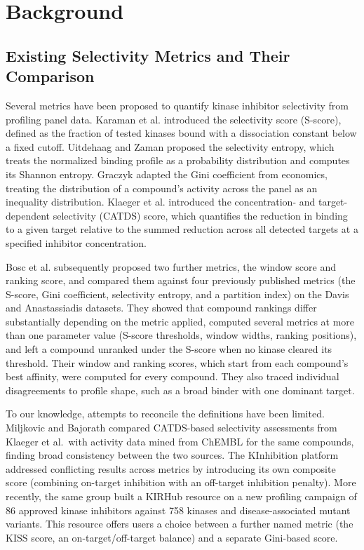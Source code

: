 \section{Background}
\label{sec:related}

\subsection{Existing Selectivity Metrics and Their Comparison}
\label{sec:related:metrics}

Several metrics have been proposed to quantify kinase inhibitor selectivity
from profiling panel data.
Karaman et al.\cite{Karaman2008} introduced the selectivity score (S-score),
defined as the fraction of tested kinases bound with a dissociation constant
below a fixed cutoff.
Uitdehaag and Zaman\cite{Uitdehaag2011} proposed the selectivity entropy,
which treats the normalized binding profile as a probability distribution and
computes its Shannon entropy.
Graczyk\cite{Graczyk2010} adapted the Gini coefficient from economics, treating
the distribution of a compound's activity across the panel as an inequality
distribution.
Klaeger et al.\cite{Klaeger2017} introduced the concentration- and
target-dependent selectivity (CATDS) score, which quantifies the reduction in
binding to a given target relative to the summed reduction across all detected
targets at a specified inhibitor concentration.

Bosc et al.\cite{Bosc2017} subsequently proposed two further metrics, the
window score and ranking score, and compared them against four previously
published metrics (the S-score, Gini coefficient, selectivity entropy, and a
partition index) on the Davis and Anastassiadis datasets. They showed that
compound rankings differ substantially depending on the metric applied, computed
several metrics at more than one parameter value (S-score thresholds, window
widths, ranking positions), and left a compound unranked under the S-score
when no kinase cleared its threshold. Their window and ranking scores, which
start from each compound's best affinity, were computed for every compound.
They also traced individual disagreements to profile shape, such as a broad
binder with one dominant target.

To our knowledge, attempts to reconcile the definitions have been limited.
Miljkovic and Bajorath\cite{Bajorath2018} compared CATDS-based selectivity
assessments from Klaeger et al.\ with activity data mined from ChEMBL for the
same compounds, finding broad consistency between the two sources.
The KInhibition platform\cite{KInhibition2018} addressed conflicting results across metrics by introducing its own composite score (combining on-target
inhibition with an off-target inhibition penalty).
More recently, the same group built a KIRHub resource\cite{Gujral2026}
on a
new profiling campaign of 86 approved kinase inhibitors against 758 kinases
and disease-associated mutant variants. This resource offers users a choice
between a further
named metric (the KISS score, an on-target/off-target balance) and a separate
Gini-based score.

